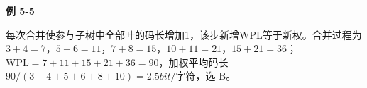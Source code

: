 {\color{ink}\bfseries 例 5-5}\par\vspace{1bp}每次合并使参与子树中全部叶的码长增加1，该步新增WPL等于新权。合并过程为\(3+\allowbreak{}4=\allowbreak{}7\)，\(5+\allowbreak{}6=\allowbreak{}11\)，\(7+\allowbreak{}8=\allowbreak{}15\)，\(10+\allowbreak{}11=\allowbreak{}21\)，\(15+\allowbreak{}21=\allowbreak{}36\)；\(\mathrm{WPL}=\allowbreak{}7+\allowbreak{}11+\allowbreak{}15+\allowbreak{}21+\allowbreak{}36=\allowbreak{}90\)，加权平均码长\(90/\allowbreak{}(3+\allowbreak{}4+\allowbreak{}5+\allowbreak{}6+\allowbreak{}8+\allowbreak{}10)=\allowbreak{}2.5 bit/\allowbreak{}\)字符，选 B。
